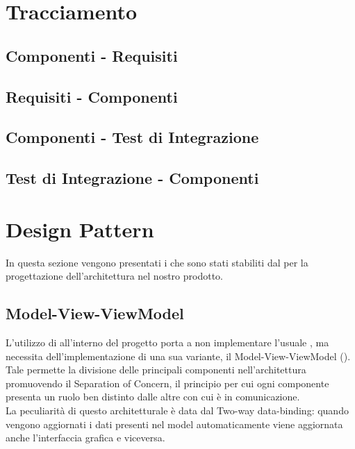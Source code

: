 \documentclass[a4paper, titlepage]{article}
\begin{document}
\section{Tracciamento}

\subsection{Componenti - Requisiti}


\subsection{Requisiti - Componenti}


\subsection{Componenti - Test di Integrazione}


\subsection{Test di Integrazione - Componenti}





\newpage
\appendix
\section{Design Pattern}
In questa sezione vengono presentati i  che sono stati stabiliti dal  per la progettazione dell'architettura nel nostro prodotto.

\subsection{Model-View-ViewModel}
L'utilizzo di  all'interno del progetto porta a non implementare l'usuale  , ma necessita dell'implementazione di una sua variante, il Model-View-ViewModel ().
\\Tale {} permette la divisione delle principali componenti nell'architettura promuovendo il Separation of Concern, il principio per cui ogni componente presenta un ruolo ben distinto dalle altre con cui è in comunicazione.
\\La peculiarità di questo  architetturale è data dal Two-way data-binding: quando vengono aggiornati i dati presenti nel model automaticamente viene aggiornata anche l'interfaccia grafica e viceversa.
\end{document}
